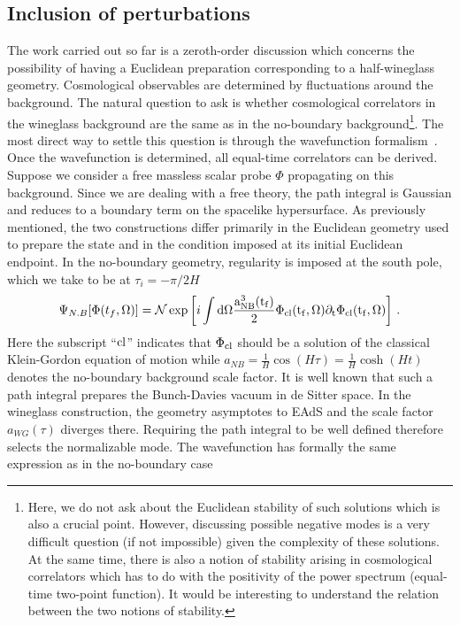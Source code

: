 \documentclass[a4paper]{article}
\begin{document}
\subsection{Inclusion of perturbations}
The work carried out so far is a zeroth-order discussion which concerns the possibility of having a Euclidean preparation corresponding to a half-wineglass geometry. Cosmological observables are determined by fluctuations around the background. The natural question to ask is whether cosmological correlators in the wineglass background are the same as in the no-boundary background\footnote{Here, we do not ask about the Euclidean stability of such solutions which is also a crucial point. However, discussing possible negative modes is a very difficult question (if not impossible) given the complexity of these solutions. At the same time, there is also a notion of stability arising in cosmological correlators which has to do with the positivity of the power spectrum (equal-time two-point function). It would be interesting to understand the relation between the two notions of stability.}. The most direct way to settle this question is through the wavefunction formalism~\cite{PhysRevD.31.1777,halliwell2009introductorylecturesquantumcosmology,Wada:1986uy}. Once the wavefunction is determined, all equal-time correlators can be derived. Suppose we consider a free massless scalar probe $\Phi$ propagating on this background. Since we are dealing with a free theory, the path integral is Gaussian and reduces to a boundary term on the spacelike hypersurface. As previously mentioned, the two constructions differ primarily in the Euclidean geometry used to prepare the state and in the condition imposed at its initial Euclidean endpoint. In the no-boundary geometry, regularity is imposed at the south pole, which we take to be at $\tau_i=-\pi/2H$
\begin{equation}\label{eq:no-boundary}
    \Psi_{N.B}[\Phi(t_f,\Omega)]=\mathcal{N}\exp\left[i\int \rm{d} \Omega \frac{a_{NB}^3(t_f)}{2}\Phi_{\rm cl}(t_f,\Omega) \partial_t\Phi_{\rm cl}(t_f,\Omega)\right]\,.
\end{equation}
Here the subscript ``$\rm cl$'' indicates that $\Phi_{\rm cl}$ should be a solution of the classical Klein-Gordon equation of motion while $a_{NB} = \frac{1}{H}\cos(H\tau) = \frac{1}{H}\cosh(Ht)$ denotes the no-boundary background scale factor. It is well known that such a path integral prepares the Bunch-Davies vacuum in de Sitter space.
In the wineglass construction, the geometry asymptotes to EAdS and the scale factor $a_{WG}(\tau)$ diverges there. Requiring the path integral to be well defined therefore selects the normalizable mode. The wavefunction has formally the same expression as in the no-boundary case
\end{document}
